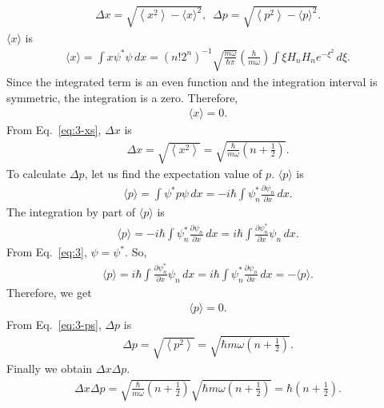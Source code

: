\documentclass[floatfix,nofootinbib,superscriptaddress,fleqn]{revtex4-2}
\begin{document}
\begin{itemize}
  \begin{align}
      \Delta x = \sqrt{\left\langle x^2\right\rangle 
      - {\langle x\rangle}^2  },\,\,\,
      \Delta p = \sqrt{\left\langle p^2\right\rangle 
      - {\langle p\rangle}^2  }.
  \end{align}
  $\langle x\rangle$ is
  \begin{align}
      \langle x\rangle = \int x\psi^*\psi\,dx 
      = (n!2^n)^{-1}\sqrt{\frac{m\omega}{\hbar\pi}}
      \left(\frac{\hbar}{m\omega}\right)
      \int \xi H_nH_n e^{-\xi^2}\,d\xi.
  \end{align}
  Since the integrated term is an even function and the integration 
  interval is symmetric,
  the integration is a zero. Therefore,
  \begin{align}
    \langle x\rangle = 0.
  \end{align}
  From Eq.~\eqref{eq:3-xs}, $\Delta x$ is
  \begin{align}
    \Delta x = \sqrt{\left\langle x^2\right\rangle}
    = \sqrt{\frac{\hbar}{m\omega}
    \left( n+\frac{1}{2}\right)}.
  \end{align}
  To calculate $\Delta p$, let us find the expectation value of $p$.
  $\langle p\rangle$ is
  \begin{align}
    \langle p\rangle = \int \psi^*p\psi\,dx
    = -i\hbar\int\psi^*_n
    \frac{\partial \psi_n}{\partial x} \,dx.
  \end{align}
  The integration by part of $\langle p\rangle$ is
  \begin{align}
      \langle p\rangle=-i\hbar\int\psi^*_n
      \frac{\partial \psi_n}{\partial x} \,dx
      =i\hbar\int\frac{\partial \psi^*_n}{\partial x}
      \psi_n \,dx.
  \end{align}
  From Eq.~\eqref{eq:3}, $\psi = \psi^*$. So,
  \begin{align}
    \langle p\rangle=i\hbar\int\frac{\partial \psi^*_n}{\partial x}
    \psi_n \,dx=i\hbar\int\psi^*_n
    \frac{\partial \psi_n}{\partial x}\,dx = -\langle p\rangle.
  \end{align}
  Therefore, we get
  \begin{align}
    \langle p\rangle = 0.
  \end{align}
  From Eq.~\eqref{eq:3-ps}, $\Delta p$ is
  \begin{align}
    \Delta p = \sqrt{\left\langle p^2\right\rangle}
    = \sqrt{\hbar m\omega\left( n+\frac{1}{2} \right)}.
  \end{align}
  Finally we obtain $\Delta x\Delta p$.
  \begin{align}
    \Delta x\Delta p = \sqrt{\frac{\hbar}{m\omega}
    \left(n+\frac{1}{2}\right)}\sqrt{\hbar m\omega
    \left(n+\frac{1}{2}\right)}
    =\hbar\left(n+\frac{1}{2}\right).
  \end{align}
\end{itemize}
\end{document}

